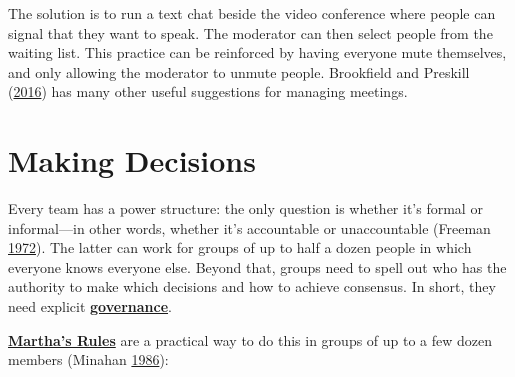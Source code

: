 \documentclass[
]{krantz}
\newcommand{\gref}[2]{\hyperlink{#2}{\textbf{#1}}}
\begin{document}
The solution is to run a text chat beside the video conference
where people can signal that they want to speak.
The moderator can then select people from the waiting list.
This practice can be reinforced by having everyone mute themselves,
and only allowing the moderator to unmute people.
Brookfield and Preskill (\protect\hyperlink{ref-Broo2016}{2016}) has many other useful suggestions for managing meetings.

\hypertarget{teams-martha}{%
\section{Making Decisions}\label{teams-martha}}

Every team has a power structure:
the only question is
whether it's formal or informal---in other words,
whether it's accountable or unaccountable (Freeman \protect\hyperlink{ref-Free1972}{1972}).
The latter can work for groups of up to half a dozen people
in which everyone knows everyone else.
Beyond that,
groups need to spell out
who has the authority to make which decisions
and how to achieve consensus.
In short,
they need explicit \gref{governance}{governance}.

\gref{Martha's Rules}{marthas\_rules} are a practical way to do this
in groups of up to a few dozen members (Minahan \protect\hyperlink{ref-Mina1986}{1986}):
\end{document}

